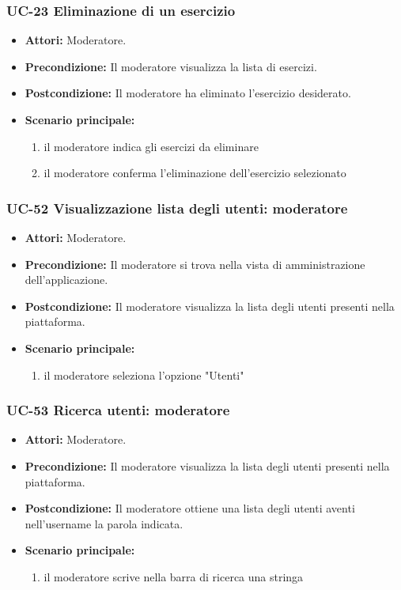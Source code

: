 \subsubsection{UC-23 Eliminazione di un esercizio}
			\begin{itemize}
			\item \textbf{Attori:} Moderatore.
			\item \textbf{Precondizione:} Il moderatore visualizza la lista di esercizi.
			\item \textbf{Postcondizione:} Il moderatore ha eliminato l'esercizio desiderato.
			\item \textbf{Scenario principale:}
				\begin{enumerate}
					\item il moderatore indica gli esercizi da eliminare
					\item il moderatore conferma l'eliminazione dell'esercizio selezionato
				\end{enumerate}
		\end{itemize}

\subsubsection{UC-52 Visualizzazione lista degli utenti: moderatore}
	\begin{itemize}
		\item \textbf{Attori:} Moderatore.
		\item \textbf{Precondizione:} Il moderatore si trova nella vista di amministrazione dell'applicazione.
		\item \textbf{Postcondizione:} Il moderatore visualizza la lista degli utenti presenti nella piattaforma.
		\item \textbf{Scenario principale:}
			\begin{enumerate}
				\item il moderatore seleziona l'opzione "Utenti"
			\end{enumerate}
	\end{itemize}
		
\subsubsection{UC-53 Ricerca utenti: moderatore}
	\begin{itemize}
		\item \textbf{Attori:} Moderatore.
		\item \textbf{Precondizione:} Il moderatore visualizza la lista degli utenti presenti nella piattaforma.
		\item \textbf{Postcondizione:} Il moderatore ottiene una lista degli utenti aventi nell'username la parola indicata.
		\item \textbf{Scenario principale:}
			\begin{enumerate}
				\item il moderatore scrive nella barra di ricerca una stringa
			\end{enumerate}
	\end{itemize}

